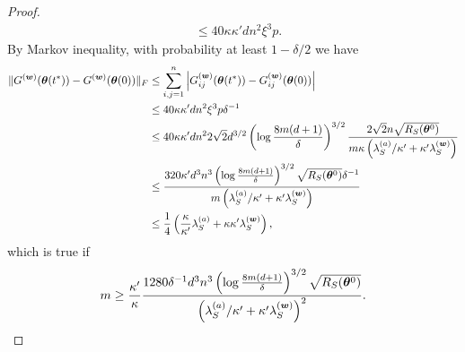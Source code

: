 \documentclass{article}
\begin{document}
\begin{proof}
\begin{equation}
\begin{aligned}
             & \leq 40\kappa\kappa' dn^2\xi^3 p.
        \end{aligned}
    \end{equation}
    By Markov inequality, with probability at least $1-\delta/2$ we have
    \begin{equation}
        \begin{aligned}
            \lVert G^{(\bm{w})}(\bm{\theta}(t^*))-G^{(\bm{w})}(\bm{\theta}(0))\rVert_F
             & \leq \sum_{i,j=1}^n\Big|G_{ij}^{(\bm{w})}(\bm{\theta}(t^*))-G^{(\bm{w})}_{ij}(\bm{\theta}(0))\Big|                                                                                                                \\
             & \leq 40\kappa\kappa' dn^2\xi^3 p\delta^{-1}                                                                                                                                                         \\
             & \leq 40\kappa\kappa' dn^2 2\sqrt{2}d^{3/2}\left(\log\frac{8m(d+1)}{\delta}\right)^{3/2}\frac{2\sqrt{2}n\sqrt{R_S(\bm{\theta}^0)}}{m\kappa\left(\lambda_S^{(a)}/\kappa'+\kappa'\lambda_S^{(\bm{w})}\right)} \\
             & \leq\frac{320\kappa' d^3n^3\left(\log\frac{8m(d+1)}{\delta}\right)^{3/2}\sqrt{R_S(\bm{\theta}^0)}\delta^{-1}}{m\left(\lambda_S^{(a)}/\kappa'+\kappa'\lambda_S^{(\bm{w})}\right)}                           \\
             & \leq \frac{1}{4}\left(\frac{\kappa}{\kappa'}\lambda_S^{(a)}+\kappa\kappa'\lambda_S^{(\bm{w})}\right),
        \end{aligned}
    \end{equation}
    which is true if
    \begin{equation}\label{cond:m2}
        m\geq\frac{\kappa'}{\kappa}\frac{1280\delta^{-1}d^3n^3\left(\log\frac{8m(d+1)}{\delta}\right)^{3/2}\sqrt{R_S(\bm{\theta}^0)}}{\left(\lambda_S^{(a)}/\kappa'+\kappa'\lambda_S^{(\bm{w})}\right)^2}.
    \end{equation}
\end{proof}
\end{document}
